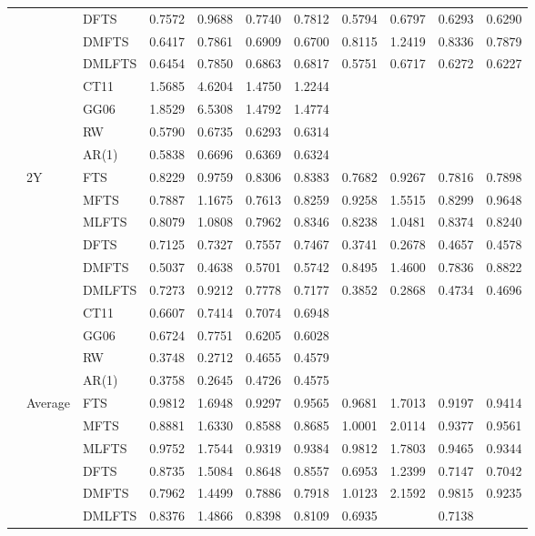 \documentclass[12pt,a4paper]{article}
\def\textBF#1{\sbox\CBox{#1}\resizebox{\wd\CBox}{\ht\CBox}{\textbf{#1}}}
\begin{document}
\begin{center}
\begin{small}
\begin{longtable}{@{}lllcccccccc@{}}
& & DFTS & 0.7572 & 0.9688 & 0.7740 & 0.7812 & 0.5794 & 0.6797 & 0.6293 & 0.6290 \\ 
& & DMFTS & 0.6417 & 0.7861 & 0.6909 & 0.6700 & 0.8115 & 1.2419 & 0.8336 & 0.7879 \\
& & DMLFTS & 0.6454 & 0.7850 & 0.6863 & 0.6817 & 0.5751 & 0.6717 & 0.6272 & 0.6227 \\
& & CT11 & 1.5685 & 4.6204 & 1.4750 & 1.2244 \\
& & GG06 & 1.8529 & 6.5308 & 1.4792 & 1.4774 \\
& & RW & 0.5790 & 0.6735 & 0.6293 & 0.6314 \\
& & AR(1) & 0.5838 & 0.6696 & 0.6369 & 0.6324 \\
  \cmidrule{2-11}
    & 2Y & FTS & 0.8229 & 0.9759 & 0.8306 & 0.8383 & 0.7682 & 0.9267 & 0.7816 & 0.7898 \\
& & MFTS & 0.7887 & 1.1675 & 0.7613 & 0.8259 & 0.9258 & 1.5515 & 0.8299 & 0.9648 \\
& & MLFTS & 0.8079 & 1.0808 & 0.7962 & 0.8346 & 0.8238 & 1.0481 & 0.8374 & 0.8240 \\
& & DFTS & 0.7125 & 0.7327 & 0.7557 & 0.7467 & 0.3741 & 0.2678 & 0.4657 & 0.4578 \\ 
& & DMFTS & 0.5037 & 0.4638 & 0.5701 & 0.5742 & 0.8495 & 1.4600 & 0.7836 & 0.8822 \\
& & DMLFTS & 0.7273 & 0.9212 & 0.7778 & 0.7177 & 0.3852 & 0.2868 & 0.4734 & 0.4696 \\
& & CT11 & 0.6607 & 0.7414 & 0.7074 & 0.6948 \\
& & GG06 & 0.6724 & 0.7751 & 0.6205 & 0.6028 \\
& & RW & 0.3748 & 0.2712 & 0.4655 & 0.4579 \\
& & AR(1) & 0.3758 & 0.2645 & 0.4726 & 0.4575 \\
  \cmidrule{2-11}
  & Average & FTS & 0.9812 & 1.6948 & 0.9297 & 0.9565 & 0.9681 & 1.7013 & 0.9197 & 0.9414 \\
 & & MFTS & 0.8881 & 1.6330 & 0.8588 & 0.8685 & 1.0001 & 2.0114 & 0.9377 & 0.9561 \\
 & & MLFTS & 0.9752 & 1.7544 & 0.9319 & 0.9384 & 0.9812 & 1.7803 & 0.9465 & 0.9344 \\
 & & DFTS & 0.8735 & 1.5084 & 0.8648 & 0.8557 & 0.6953 & 1.2399 & 0.7147 & 0.7042 \\
 & & DMFTS & 0.7962 & 1.4499 & 0.7886 & 0.7918 & 1.0123 & 2.1592 & 0.9815 & 0.9235 \\
 & & DMLFTS & 0.8376 & 1.4866 & 0.8398 & 0.8109 & 0.6935 & \textBF{1.2241} & 0.7138 & \textBF{0.7031} \\

\end{longtable}
\end{small}
\end{center}
\end{document}
